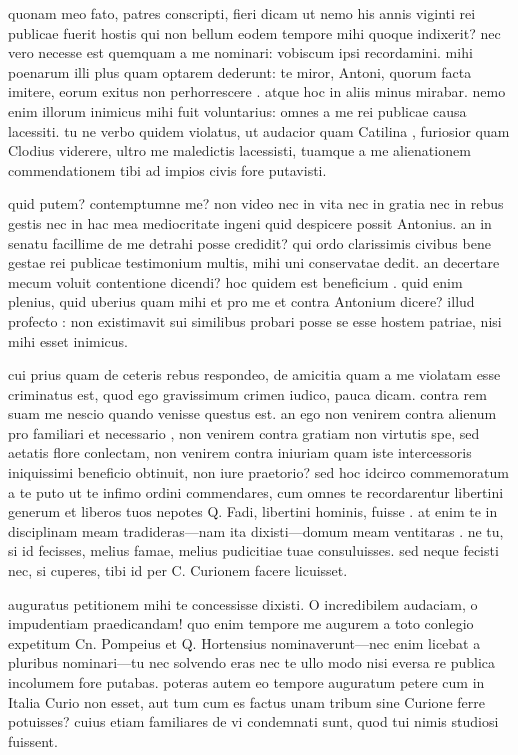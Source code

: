 
 quonam meo fato, patres conscripti, fieri dicam ut nemo his annis viginti rei publicae fuerit hostis qui non bellum eodem tempore mihi quoque indixerit? nec vero necesse est quemquam a me nominari: vobiscum ipsi recordamini. mihi poenarum illi plus quam optarem dederunt: te miror, Antoni, quorum facta imitere, eorum exitus non perhorrescere . atque hoc in aliis minus mirabar. nemo enim illorum inimicus mihi fuit voluntarius: omnes a me rei publicae causa lacessiti. tu ne verbo quidem violatus, ut audacior quam Catilina , furiosior quam Clodius viderere, ultro me maledictis lacessisti, tuamque a me alienationem commendationem tibi ad impios civis fore putavisti.

 quid putem? contemptumne me? non video nec in vita nec in gratia nec in rebus gestis nec in hac mea mediocritate ingeni quid despicere possit Antonius. an in senatu facillime de me detrahi posse credidit? qui ordo clarissimis civibus bene gestae rei publicae testimonium multis, mihi uni conservatae dedit. an decertare mecum voluit contentione dicendi? hoc quidem est beneficium . quid enim plenius, quid uberius quam mihi et pro me et contra Antonium dicere? illud profecto : non existimavit sui similibus probari posse se esse hostem patriae, nisi mihi esset inimicus.

 cui prius quam de ceteris rebus respondeo, de amicitia quam a me violatam esse criminatus est, quod ego gravissimum crimen iudico, pauca dicam. contra rem suam me nescio quando venisse questus est. an ego non venirem contra alienum pro familiari et necessario , non venirem contra gratiam non virtutis spe, sed aetatis flore conlectam, non venirem contra iniuriam quam iste intercessoris iniquissimi beneficio obtinuit, non iure praetorio? sed hoc idcirco commemoratum a te puto ut te infimo ordini commendares, cum omnes te recordarentur libertini generum et liberos tuos nepotes Q. Fadi, libertini hominis, fuisse . at enim te in disciplinam meam tradideras—nam ita dixisti—domum meam ventitaras . ne tu, si id fecisses, melius famae, melius pudicitiae tuae consuluisses. sed neque fecisti nec, si cuperes, tibi id per C. Curionem facere licuisset.

 auguratus petitionem mihi te concessisse dixisti. O incredibilem audaciam, o impudentiam praedicandam! quo enim tempore me augurem a toto conlegio expetitum Cn. Pompeius et Q. Hortensius nominaverunt—nec enim licebat a pluribus nominari—tu nec solvendo eras nec te ullo modo nisi eversa re publica incolumem fore putabas. poteras autem eo tempore auguratum petere cum in Italia Curio non esset, aut tum cum es factus unam tribum sine Curione ferre potuisses? cuius etiam familiares de vi condemnati sunt, quod tui nimis studiosi fuissent.


